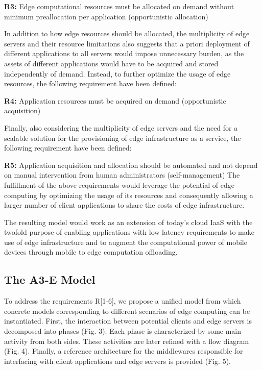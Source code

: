 \textbf{R3:} Edge computational resources must be allocated on demand without minimum preallocation per application (opportunistic allocation) 
	
In addition to how edge resources should be allocated, the multiplicity of edge servers and their resource limitations also suggests that a priori deployment of different applications to all servers would impose unnecessary burden, as the assets of different applications would have to be acquired and stored independently of demand. Instead, to further optimize the usage of edge resources, the following requirement have been defined: 	

\textbf{R4:} Application resources must be acquired on demand (opportunistic acquisition) 

Finally, also considering the multiplicity of edge servers and the need for a scalable solution for the provisioning of edge infrastructure as a service, the following requirement have been defined:

\textbf{R5:} Application acquisition and allocation should be automated and not depend on  manual intervention from human administrators (self-management)
The fulfillment of the above requirements would leverage the potential of edge computing by optimizing the usage of its resources and consequently allowing a larger number of client applications to share the costs of edge infrastructure.

The resulting model would work as an extension of today’s cloud IaaS with the twofold purpose of enabling applications with low latency requirements to make use of edge infrastructure and to augment the computational power of mobile devices through mobile to edge computation offloading. 

\subsection{The A3-E Model}

To address the requirements R[1-6], we propose a unified model from which concrete models corresponding to different scenarios of edge computing can be instantiated. 
First, the interaction between potential clients and edge servers is decomposed into phases (Fig. 3). Each phase is characterized by some main activity from both sides. These activities are later refined with a flow diagram (Fig. 4). Finally, a reference architecture for the middlewares responsible for interfacing with client applications and edge servers is provided (Fig. 5).

